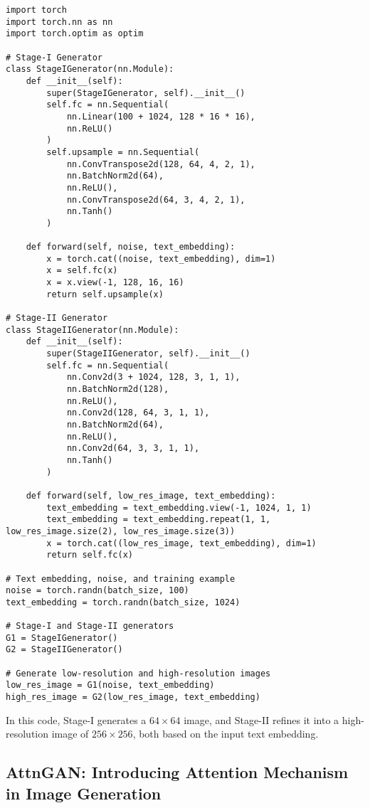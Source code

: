 \begin{lstlisting}[style=python]
import torch
import torch.nn as nn
import torch.optim as optim

# Stage-I Generator
class StageIGenerator(nn.Module):
    def __init__(self):
        super(StageIGenerator, self).__init__()
        self.fc = nn.Sequential(
            nn.Linear(100 + 1024, 128 * 16 * 16),
            nn.ReLU()
        )
        self.upsample = nn.Sequential(
            nn.ConvTranspose2d(128, 64, 4, 2, 1),
            nn.BatchNorm2d(64),
            nn.ReLU(),
            nn.ConvTranspose2d(64, 3, 4, 2, 1),
            nn.Tanh()
        )
    
    def forward(self, noise, text_embedding):
        x = torch.cat((noise, text_embedding), dim=1)
        x = self.fc(x)
        x = x.view(-1, 128, 16, 16)
        return self.upsample(x)

# Stage-II Generator
class StageIIGenerator(nn.Module):
    def __init__(self):
        super(StageIIGenerator, self).__init__()
        self.fc = nn.Sequential(
            nn.Conv2d(3 + 1024, 128, 3, 1, 1),
            nn.BatchNorm2d(128),
            nn.ReLU(),
            nn.Conv2d(128, 64, 3, 1, 1),
            nn.BatchNorm2d(64),
            nn.ReLU(),
            nn.Conv2d(64, 3, 3, 1, 1),
            nn.Tanh()
        )
    
    def forward(self, low_res_image, text_embedding):
        text_embedding = text_embedding.view(-1, 1024, 1, 1)
        text_embedding = text_embedding.repeat(1, 1, low_res_image.size(2), low_res_image.size(3))
        x = torch.cat((low_res_image, text_embedding), dim=1)
        return self.fc(x)

# Text embedding, noise, and training example
noise = torch.randn(batch_size, 100)
text_embedding = torch.randn(batch_size, 1024)

# Stage-I and Stage-II generators
G1 = StageIGenerator()
G2 = StageIIGenerator()

# Generate low-resolution and high-resolution images
low_res_image = G1(noise, text_embedding)
high_res_image = G2(low_res_image, text_embedding)
\end{lstlisting}

In this code, Stage-I generates a \(64 \times 64\) image, and Stage-II refines it into a high-resolution image of \(256 \times 256\), both based on the input text embedding.

\subsection{AttnGAN: Introducing Attention Mechanism in Image Generation}

